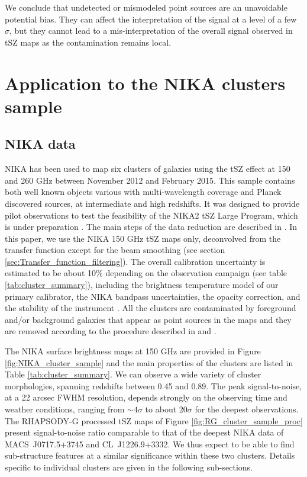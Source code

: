 \documentclass[twocolumn,traditabstract]{aa}
\begin{document}
We conclude that undetected or mismodeled point sources are an unavoidable potential bias. They can affect the interpretation of the signal at a level of a few $\sigma$, but they cannot lead to a mis-interpretation of the overall signal observed in tSZ maps as the contamination remains local.

\section{Application to the NIKA clusters sample}\label{sec:Application_to_the_NIKA_clusters_sample}
\subsection{NIKA data}\label{sec:NIKA_Data}
NIKA has been used to map six clusters of galaxies using the tSZ effect at 150 and 260 GHz between November 2012 and February 2015. This sample contains both well known objects various with multi-wavelength coverage and Planck discovered sources, at intermediate and high redshifts. It was designed to provide pilot observations to test the feasibility of the NIKA2 tSZ Large Program, which is under preparation \citep{Comis2016}. The main steps of the data reduction are described in \cite{Adam2014,Adam2015}. In this paper, we use the NIKA 150 GHz tSZ maps only, deconvolved from the transfer function except for the beam smoothing (see section \ref{sec:Transfer_function_filtering}). The overall calibration uncertainty is estimated to be about 10\% depending on the observation campaign (see table \ref{tab:cluster_summary}), including the brightness temperature model of our primary calibrator, the NIKA bandpass uncertainties, the opacity correction, and the stability of the instrument \citep{Catalano2014}. All the clusters are contaminated by foreground and/or background galaxies that appear as point sources in the maps and they are removed according to the procedure described in \cite{Adam2015} and \cite{Adam2016a}. 

The NIKA surface brightness maps at 150 GHz are provided in Figure \ref{fig:NIKA_cluster_sample} and the main properties of the clusters are listed in Table \ref{tab:cluster_summary}. We can observe a wide variety of cluster morphologies, spanning redshifts between 0.45 and 0.89. The peak signal-to-noise, at a 22 arcsec FWHM resolution, depends strongly on the observing time and weather conditions, ranging from $\sim 4 \sigma$ to about $20 \sigma$ for the deepest observations. The RHAPSODY-G processed tSZ maps of Figure \ref{fig:RG_cluster_sample_proc} present signal-to-noise ratio comparable to that of the deepest NIKA data of \mbox{MACS~J0717.5+3745} and \mbox{CL~J1226.9+3332}. We thus expect to be able to find sub-structure features at a similar significance within these two clusters. Details specific to individual clusters are given in the following sub-sections.
\end{document}
